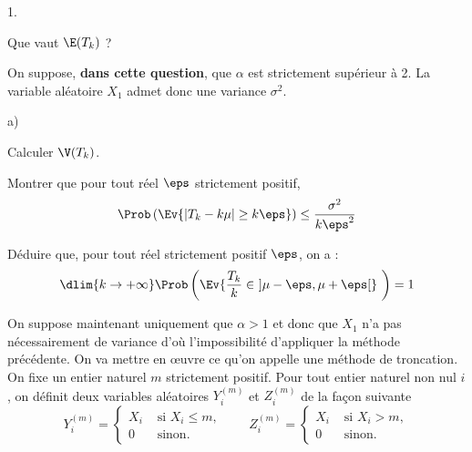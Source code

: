 \begin{noliste}{1.}
  \setlength{\itemsep}{4mm} %
  \setcounter{enumi}{6}
\item Que vaut $\E(T_{k})$ ? 
  
  




\item On suppose, \textbf{dans cette question}, que $\alpha$ est
  strictement supérieur à 2. La variable aléatoire $X_{1}$ admet donc
  une variance $\sigma^{2}$.
  \begin{noliste}{a)}
    \setlength{\itemsep}{2mm}
  \item Calculer $\V(T_{k})$.

    

  \item Montrer que pour tout réel $\eps$ strictement positif, 
    \[
    \Prob\left(\Ev{ |T_{k} - k\mu| \geq k \eps}\right) \leq
    \dfrac{\sigma^{2}}{k \eps^{2}}
    \]
    
    

    


  \item Déduire que, pour tout réel strictement positif $\eps$, on a :
    \[
    \dlim{k \to + \infty} \Prob\left(\Ev{\frac{T_{k}}{k} \in \ ] \mu -
        \eps, \mu + \eps[} \ \right) = 1
    \]

    
  \end{noliste}

\item On suppose maintenant uniquement que $\alpha >1$ et donc que
  $X_{1}$ n'a pas nécessairement de variance d'où l'impossibilité
  d'appliquer la méthode précédente. On va mettre en \oe{}uvre ce
  qu'on appelle une méthode de troncation.\\
  On fixe un entier naturel $m$ strictement positif. Pour tout entier
  naturel non nul $i$, on définit deux variables aléatoires
  $Y_{i}^{(m)}$ et $Z_{i}^{(m)}$ de la façon suivante
  \[
  Y_{i}^{(m)} = \left\{
    \begin{array}{cl}
      X_{i} & \text{ si } X_{i} \leq m, \\
      0 & \text{ sinon}.
    \end{array}
  \right. %
  \qquad %
  Z_{i}^{(m)} = %
  \left\{
    \begin{array}{cl}
      X_{i} & \text{ si } X_{i} > m, \\
      0 & \text{ sinon}.
    \end{array}
  \right.
  \]
\end{noliste}
